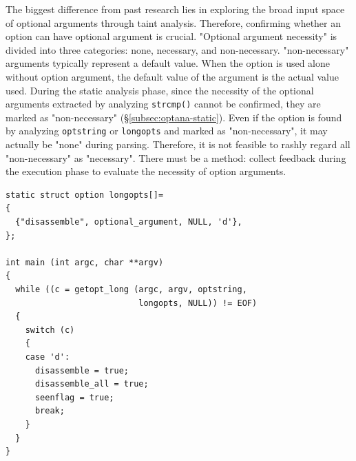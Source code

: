 The biggest difference from past research lies in exploring the broad input space of optional arguments through taint analysis. Therefore, confirming whether an option can have optional argument is crucial.
"Optional argument necessity" is divided into three categories: none, necessary, and non-necessary. "non-necessary" arguments typically represent a default value. When the option is used alone without option argument, the default value of the argument is the actual value used.
During the static analysis phase, since the necessity of the optional arguments extracted by analyzing \texttt{strcmp()} cannot be confirmed, they are marked as "non-necessary" (\S \ref{subsec:optana-static}). Even if the option is found by analyzing \texttt{optstring} or \texttt{longopts} and marked as "non-necessary", it may actually be "none" during parsing.
Therefore, it is not feasible to rashly regard all "non-necessary" as "necessary". There must be a method: collect feedback during the execution phase to evaluate the necessity of option arguments.

\iffalse
\begin{lstlisting}[float=h!, caption=\texttt{objdump} 非必要選項參數範例, label=lst:optional-arg]
static struct option longopts[]=
{
  {"disassemble", optional_argument, NULL, 'd'},
};

int main (int argc, char **argv)
{
  while ((c = getopt_long (argc, argv, optstring,
                           longopts, NULL)) != EOF)
  {
    switch (c)
    {
    case 'd':
      disassemble = true;
      disassemble_all = true;
      seenflag = true;
      break;
    }
  }
}
\end{lstlisting}

